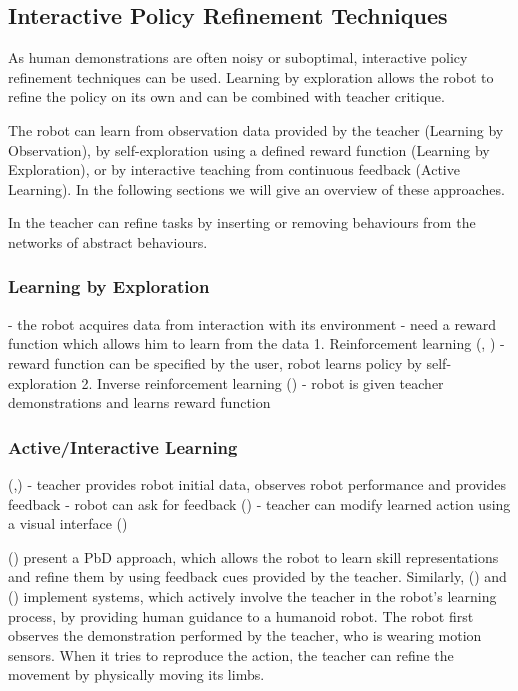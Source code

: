 \subsection{Interactive Policy Refinement Techniques}\label{subsec:Other RP Methods}
As human demonstrations are often noisy or suboptimal, interactive policy refinement techniques can be used.
Learning by exploration allows the robot to refine the policy on its own and can be combined with  teacher critique. 

The robot can learn from observation data provided by the teacher (Learning by Observation), by self-exploration using a defined reward function (Learning by Exploration), or by interactive teaching from continuous feedback (Active Learning). In the following sections we will give an overview of these approaches.

In \cite{nicolescu2003natural} the teacher can refine tasks by inserting or removing behaviours from the networks of abstract behaviours.

\subsubsection{Learning by Exploration}\label{sssec:LbExploration}

- the robot acquires data from interaction with its environment
- need a reward function which allows him to learn from the data
1. Reinforcement learning (\cite{sutton1998reinforcement}, \cite{mnih2015human})
 - reward function can be specified by the user, robot learns policy by self-exploration
 2. Inverse reinforcement learning (\cite{abbeel2004apprenticeship})
 - robot is given teacher demonstrations and learns reward function

\subsubsection{Active/Interactive Learning}\label{sssec:Active Learning} (\cite{chernova2014robot},\cite{calinon2007active})
 - teacher provides robot initial data, observes robot performance and provides feedback
     - robot can ask for feedback (\cite{cakmak2012aaai})
 - teacher can modify learned action using a visual interface (\cite{alexandrova2015roboflow})

 (\cite{nicolescu2003natural}) present a PbD approach, which allows the robot to learn skill representations and refine them by using feedback cues provided by the teacher.
Similarly, (\cite{calinon2007active}) and (\cite{calinon2007incremental}) implement systems, which actively involve the teacher in the robot's learning process, by providing human guidance to a humanoid robot. The robot first observes the demonstration performed by the teacher, who is wearing motion sensors. When it tries to reproduce the action, the teacher can refine the movement by physically moving its limbs.

